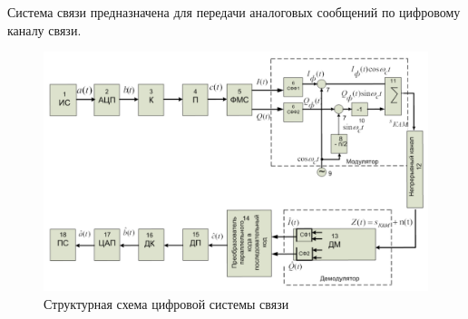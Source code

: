\documentclass[a4paper, 12pt]{article}
\begin{document}
Система связи предназначена для передачи аналоговых сообщений
по цифровому каналу связи.
\begin{figure}[H]
  \includegraphics[scale=0.5]{struct_scheme}
  \caption{Структурная схема цифровой системы связи}
  \label{fig:struct_scheme}
\end{figure}
\end{document}
